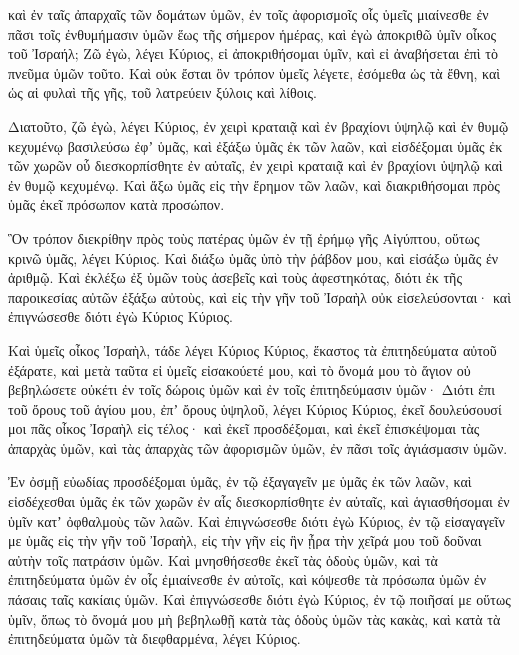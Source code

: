 {καὶ ἐν ταῖς ἀπαρχαῖς τῶν δομάτων ὑμῶν, ἐν τοῖς ἀφορισμοῖς οἷς ὑμεῖς μιαίνεσθε ἐν πᾶσι τοῖς ἐνθυμήμασιν ὑμῶν ἕως τῆς σήμερον ἡμέρας, καὶ ἐγὼ ἀποκριθῶ ὑμῖν οἶκος τοῦ Ἰσραήλ; Ζῶ ἐγὼ, λέγει Κύριος, εἰ ἀποκριθήσομαι ὑμῖν, καὶ εἰ ἀναβήσεται ἐπὶ τὸ πνεῦμα ὑμῶν τοῦτο.
Καὶ οὐκ ἔσται ὃν τρόπον ὑμεῖς λέγετε, ἐσόμεθα ὡς τὰ ἔθνη, καὶ ὡς αἱ φυλαὶ τῆς γῆς, τοῦ λατρεύειν ξύλοις καὶ λίθοις.
\par }{\PP {}Διατοῦτο, ζῶ ἐγὼ, λέγει Κύριος, ἐν χειρὶ κραταιᾷ καὶ ἐν βραχίονι ὑψηλῷ καὶ ἐν θυμῷ κεχυμένῳ βασιλεύσω ἐφʼ ὑμᾶς,
καὶ ἐξάξω ὑμᾶς ἐκ τῶν λαῶν, καὶ εἰσδέξομαι ὑμᾶς ἐκ τῶν χωρῶν οὗ διεσκορπίσθητε ἐν αὐταῖς, ἐν χειρὶ κραταιᾷ καὶ ἐν βραχίονι ὑψηλῷ καὶ ἐν θυμῷ κεχυμένῳ.
Καὶ ἄξω ὑμᾶς εἰς τὴν ἔρημον τῶν λαῶν, καὶ διακριθήσομαι πρὸς ὑμᾶς ἐκεῖ πρόσωπον κατὰ προσώπον.
\par }{\PP {}Ὃν τρόπον διεκρίθην πρὸς τοὺς πατέρας ὑμῶν ἐν τῇ ἐρήμῳ γῆς Αἰγύπτου, οὕτως κρινῶ ὑμᾶς, λέγει Κύριος.
Καὶ διάξω ὑμᾶς ὑπὸ τὴν ῥάβδον μου, καὶ εἰσάξω ὑμᾶς ἐν ἀριθμῷ.
Καὶ ἐκλέξω ἐξ ὑμῶν τοὺς ἀσεβεῖς καὶ τοὺς ἀφεστηκότας, διότι ἐκ τῆς παροικεσίας αὐτῶν ἐξάξω αὐτοὺς, καὶ εἰς τὴν γῆν τοῦ Ἰσραὴλ οὐκ εἰσελεύσονται· καὶ ἐπιγνώσεσθε διότι ἐγὼ Κύριος Κύριος.
\par }{\PP {}Καὶ ὑμεῖς οἶκος Ἰσραὴλ, τάδε λέγει Κύριος Κύριος, ἕκαστος τὰ ἐπιτηδεύματα αὐτοῦ ἐξάρατε, καὶ μετὰ ταῦτα εἰ ὑμεῖς εἰσακούετέ μου, καὶ τὸ ὄνομά μου τὸ ἅγιον οὐ βεβηλώσετε οὐκέτι ἐν τοῖς δώροις ὑμῶν καὶ ἐν τοῖς ἐπιτηδεύμασιν ὑμῶν·
Διότι ἐπι τοῦ ὄρους τοῦ ἁγίου μου, ἐπʼ ὄρους ὑψηλοῦ, λέγει Κύριος Κύριος, ἐκεῖ δουλεύσουσί μοι πᾶς οἶκος Ἰσραὴλ εἰς τέλος· καὶ ἐκεῖ προσδέξομαι, καὶ ἐκεῖ ἐπισκέψομαι τὰς ἀπαρχὰς ὑμῶν, καὶ τὰς ἀπαρχὰς τῶν ἀφορισμῶν ὑμῶν, ἐν πᾶσι τοῖς ἁγιάσμασιν ὑμῶν.
\par }{\PP {}Ἐν ὀσμῇ εὐωδίας προσδέξομαι ὑμᾶς, ἐν τῷ ἐξαγαγεῖν με ὑμᾶς ἐκ τῶν λαῶν, καὶ εἰσδέχεσθαι ὑμᾶς ἐκ τῶν χωρῶν ἐν αἷς διεσκορπίσθητε ἐν αὐταῖς, καὶ ἁγιασθήσομαι ἐν ὑμῖν κατʼ ὀφθαλμοὺς τῶν λαῶν.
Καὶ ἐπιγνώσεσθε διότι ἐγὼ Κύριος, ἐν τῷ εἰσαγαγεῖν με ὑμᾶς εἰς τὴν γῆν τοῦ Ἰσραὴλ, εἰς τὴν γῆν εἰς ἣν ᾖρα τὴν χεῖρά μου τοῦ δοῦναι αὐτὴν τοῖς πατράσιν ὑμῶν.
Καὶ μνησθήσεσθε ἐκεῖ τὰς ὁδοὺς ὑμῶν, καὶ τὰ ἐπιτηδεύματα ὑμῶν ἐν οἷς ἐμιαίνεσθε ἐν αὐτοῖς, καὶ κόψεσθε τὰ πρόσωπα ὑμῶν ἐν πάσαις ταῖς κακίαις ὑμῶν.
Καὶ ἐπιγνώσεσθε διότι ἐγὼ Κύριος, ἐν τῷ ποιῆσαί με οὕτως ὑμῖν, ὅπως τὸ ὄνομά μου μὴ βεβηλωθῇ κατὰ τὰς ὁδοὺς ὑμῶν τὰς κακὰς, καὶ κατὰ τὰ ἐπιτηδεύματα ὑμῶν τὰ διεφθαρμένα, λέγει Κύριος.

}
